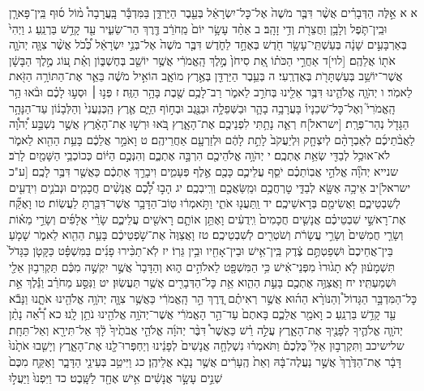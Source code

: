 \documentclass[twoside, openany, parskip=half, 11pt]{book}
\begin{document}
א א אֵ֣לֶּה הַדְּבָרִ֗ים אֲשֶׁ֨ר דִּבֶּ֤ר מֹשֶׁה֙ אֶל־כׇּל־יִשְׂרָאֵ֔ל בְּעֵ֖בֶר הַיַּרְדֵּ֑ן בַּמִּדְבָּ֡ר בָּֽעֲרָבָה֩ מ֨וֹל ס֜וּף בֵּֽין־פָּארָ֧ן וּבֵֽין־תֹּ֛פֶל וְלָבָ֥ן וַחֲצֵרֹ֖ת וְדִ֥י זָהָֽב׃ ב אַחַ֨ד עָשָׂ֥ר יוֹם֙ מֵֽחֹרֵ֔ב דֶּ֖רֶךְ הַר־שֵׂעִ֑יר עַ֖ד קָדֵ֥שׁ בַּרְנֵֽעַ׃ ג וַיְהִי֙ בְּאַרְבָּעִ֣ים שָׁנָ֔ה בְּעַשְׁתֵּֽי־עָשָׂ֥ר חֹ֖דֶשׁ בְּאֶחָ֣ד לַחֹ֑דֶשׁ דִּבֶּ֤ר מֹשֶׁה֙ אֶל־בְּנֵ֣י יִשְׂרָאֵ֔ל כְּ֠כֹ֠ל אֲשֶׁ֨ר צִוָּ֧ה יְהֹוָ֛ה אֹת֖וֹ אֲלֵהֶֽם׃ [לוי]ד אַחֲרֵ֣י הַכֹּת֗וֹ אֵ֚ת סִיחֹן֙ מֶ֣לֶךְ הָֽאֱמֹרִ֔י אֲשֶׁ֥ר יוֹשֵׁ֖ב בְּחֶשְׁבּ֑וֹן וְאֵ֗ת ע֚וֹג מֶ֣לֶךְ הַבָּשָׁ֔ן אֲשֶׁר־יוֹשֵׁ֥ב בְּעַשְׁתָּרֹ֖ת בְּאֶדְרֶֽעִי׃ ה בְּעֵ֥בֶר הַיַּרְדֵּ֖ן בְּאֶ֣רֶץ מוֹאָ֑ב הוֹאִ֣יל מֹשֶׁ֔ה בֵּאֵ֛ר אֶת־הַתּוֹרָ֥ה הַזֹּ֖את לֵאמֹֽר׃ ו יְהֹוָ֧ה אֱלֹהֵ֛ינוּ דִּבֶּ֥ר אֵלֵ֖ינוּ בְּחֹרֵ֣ב לֵאמֹ֑ר רַב־לָכֶ֥ם שֶׁ֖בֶת בָּהָ֥ר הַזֶּֽה׃ ז פְּנ֣וּ ׀ וּסְע֣וּ לָכֶ֗ם וּבֹ֨אוּ הַ֥ר הָֽאֱמֹרִי֮ וְאֶל־כׇּל־שְׁכֵנָיו֒ בָּעֲרָבָ֥ה בָהָ֛ר וּבַשְּׁפֵלָ֥ה וּבַנֶּ֖גֶב וּבְח֣וֹף הַיָּ֑ם אֶ֤רֶץ הַֽכְּנַעֲנִי֙ וְהַלְּבָנ֔וֹן עַד־הַנָּהָ֥ר הַגָּדֹ֖ל נְהַר־פְּרָֽת׃ [ישראל]ח רְאֵ֛ה נָתַ֥תִּי לִפְנֵיכֶ֖ם אֶת־הָאָ֑רֶץ בֹּ֚אוּ וּרְשׁ֣וּ אֶת־הָאָ֔רֶץ אֲשֶׁ֣ר נִשְׁבַּ֣ע יְ֠הֹוָ֠ה לַאֲבֹ֨תֵיכֶ֜ם לְאַבְרָהָ֨ם לְיִצְחָ֤ק וּֽלְיַעֲקֹב֙ לָתֵ֣ת לָהֶ֔ם וּלְזַרְעָ֖ם אַחֲרֵיהֶֽם׃ ט וָאֹמַ֣ר אֲלֵכֶ֔ם בָּעֵ֥ת הַהִ֖וא לֵאמֹ֑ר לֹא־אוּכַ֥ל לְבַדִּ֖י שְׂאֵ֥ת אֶתְכֶֽם׃ י יְהֹוָ֥ה אֱלֹהֵיכֶ֖ם הִרְבָּ֣ה אֶתְכֶ֑ם וְהִנְּכֶ֣ם הַיּ֔וֹם כְּכוֹכְבֵ֥י הַשָּׁמַ֖יִם לָרֹֽב׃ שנייא יְהֹוָ֞ה אֱלֹהֵ֣י אֲבֽוֹתֵכֶ֗ם יֹסֵ֧ף עֲלֵיכֶ֛ם כָּכֶ֖ם אֶ֣לֶף פְּעָמִ֑ים וִיבָרֵ֣ךְ אֶתְכֶ֔ם כַּאֲשֶׁ֖ר דִּבֶּ֥ר לָכֶֽם׃ [ע"כ ישראל]יב אֵיכָ֥ה אֶשָּׂ֖א לְבַדִּ֑י טׇרְחֲכֶ֥ם וּמַֽשַּׂאֲכֶ֖ם וְרִֽיבְכֶֽם׃ יג הָב֣וּ לָ֠כֶ֠ם אֲנָשִׁ֨ים חֲכָמִ֧ים וּנְבֹנִ֛ים וִידֻעִ֖ים לְשִׁבְטֵיכֶ֑ם וַאֲשִׂימֵ֖ם בְּרָאשֵׁיכֶֽם׃ יד וַֽתַּעֲנ֖וּ אֹתִ֑י וַתֹּ֣אמְר֔וּ טֽוֹב־הַדָּבָ֥ר אֲשֶׁר־דִּבַּ֖רְתָּ לַעֲשֽׂוֹת׃ טו וָאֶקַּ֞ח אֶת־רָאשֵׁ֣י שִׁבְטֵיכֶ֗ם אֲנָשִׁ֤ים חֲכָמִים֙ וִֽידֻעִ֔ים וָאֶתֵּ֥ן אוֹתָ֛ם רָאשִׁ֖ים עֲלֵיכֶ֑ם שָׂרֵ֨י אֲלָפִ֜ים וְשָׂרֵ֣י מֵא֗וֹת וְשָׂרֵ֤י חֲמִשִּׁים֙ וְשָׂרֵ֣י עֲשָׂרֹ֔ת וְשֹׁטְרִ֖ים לְשִׁבְטֵיכֶֽם׃ טז וָאֲצַוֶּה֙ אֶת־שֹׁ֣פְטֵיכֶ֔ם בָּעֵ֥ת הַהִ֖וא לֵאמֹ֑ר שָׁמֹ֤עַ בֵּין־אֲחֵיכֶם֙ וּשְׁפַטְתֶּ֣ם צֶ֔דֶק בֵּֽין־אִ֥ישׁ וּבֵין־אָחִ֖יו וּבֵ֥ין גֵּרֽוֹ׃ יז לֹֽא־תַכִּ֨ירוּ פָנִ֜ים בַּמִּשְׁפָּ֗ט כַּקָּטֹ֤ן כַּגָּדֹל֙ תִּשְׁמָע֔וּן לֹ֤א תָג֙וּרוּ֙ מִפְּנֵי־אִ֔ישׁ כִּ֥י הַמִּשְׁפָּ֖ט לֵאלֹהִ֣ים ה֑וּא וְהַדָּבָר֙ אֲשֶׁ֣ר יִקְשֶׁ֣ה מִכֶּ֔ם תַּקְרִב֥וּן אֵלַ֖י וּשְׁמַעְתִּֽיו׃ יח וָאֲצַוֶּ֥ה אֶתְכֶ֖ם בָּעֵ֣ת הַהִ֑וא אֵ֥ת כׇּל־הַדְּבָרִ֖ים אֲשֶׁ֥ר תַּעֲשֽׂוּן׃ יט וַנִּסַּ֣ע מֵחֹרֵ֗ב וַנֵּ֡לֶךְ אֵ֣ת כׇּל־הַמִּדְבָּ֣ר הַגָּדוֹל֩ וְהַנּוֹרָ֨א הַה֜וּא אֲשֶׁ֣ר רְאִיתֶ֗ם דֶּ֚רֶךְ הַ֣ר הָֽאֱמֹרִ֔י כַּאֲשֶׁ֥ר צִוָּ֛ה יְהֹוָ֥ה אֱלֹהֵ֖ינוּ אֹתָ֑נוּ וַנָּבֹ֕א עַ֖ד קָדֵ֥שׁ בַּרְנֵֽעַ׃ כ וָאֹמַ֖ר אֲלֵכֶ֑ם בָּאתֶם֙ עַד־הַ֣ר הָאֱמֹרִ֔י אֲשֶׁר־יְהֹוָ֥ה אֱלֹהֵ֖ינוּ נֹתֵ֥ן לָֽנוּ׃ כא רְ֠אֵ֠ה נָתַ֨ן יְהֹוָ֧ה אֱלֹהֶ֛יךָ לְפָנֶ֖יךָ אֶת־הָאָ֑רֶץ עֲלֵ֣ה רֵ֗שׁ כַּאֲשֶׁר֩ דִּבֶּ֨ר יְהֹוָ֜ה אֱלֹהֵ֤י אֲבֹתֶ֙יךָ֙ לָ֔ךְ אַל־תִּירָ֖א וְאַל־תֵּחָֽת׃ שלישיכב וַתִּקְרְב֣וּן אֵלַי֮ כֻּלְּכֶם֒ וַתֹּאמְר֗וּ נִשְׁלְחָ֤ה אֲנָשִׁים֙ לְפָנֵ֔ינוּ וְיַחְפְּרוּ־לָ֖נוּ אֶת־הָאָ֑רֶץ וְיָשִׁ֤בוּ אֹתָ֙נוּ֙ דָּבָ֔ר אֶת־הַדֶּ֙רֶךְ֙ אֲשֶׁ֣ר נַעֲלֶה־בָּ֔הּ וְאֵת֙ הֶֽעָרִ֔ים אֲשֶׁ֥ר נָבֹ֖א אֲלֵיהֶֽן׃ כג וַיִּיטַ֥ב בְּעֵינַ֖י הַדָּבָ֑ר וָאֶקַּ֤ח מִכֶּם֙ שְׁנֵ֣ים עָשָׂ֣ר אֲנָשִׁ֔ים אִ֥ישׁ אֶחָ֖ד לַשָּֽׁבֶט׃ כד וַיִּפְנוּ֙ וַיַּעֲל֣וּ 
\end{document}
